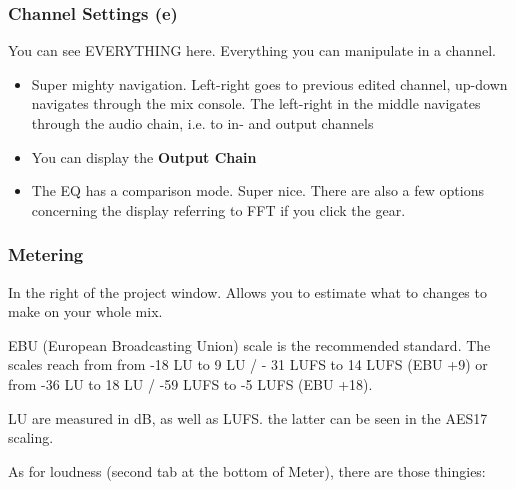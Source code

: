 \documentclass[10pt]{article}
\begin{document}
\subsubsection{Channel Settings (e)}

You can see EVERYTHING here. Everything you can manipulate in a channel.

\begin{itemize}
	\item Super mighty navigation. Left-right goes to previous edited channel, up-down navigates through the mix console. The left-right in the middle navigates through the audio chain, i.e. to in- and output channels
	\item You can display the \textbf{Output Chain}
	\item The EQ has a comparison mode. Super nice. There are also a few options concerning the display referring to FFT if you click the gear.
\end{itemize}

\subsubsection{Metering}

In the right of the project window. Allows you to estimate what to changes to make on your whole mix.

EBU (European Broadcasting Union) scale is the recommended standard. The scales reach from from -18 LU to 9 LU / - 31 LUFS to 14 LUFS (EBU +9) or from -36 LU to 18 LU / -59 LUFS to -5 LUFS (EBU +18).

LU are measured in dB, as well as LUFS. the latter can be seen in the AES17 scaling.

As for loudness (second tab at the bottom of Meter), there are those thingies:
\end{document}
